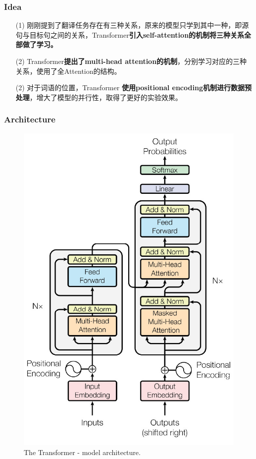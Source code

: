 \documentclass[letterpaper,10pt]{article}
\begin{document}
	\subsubsection{Idea}
	
	\begin{itemize}
	
	\item [(1)] 刚刚提到了翻译任务存在有三种关系，原来的模型只学到其中一种，即源句与目标句之间的关系，Transformer\textbf{引入self-attention的机制将三种关系全部做了学习。}
	\item [(2)]	
	Transformer\textbf{提出了multi-head attention的机制}，分别学习对应的三种关系，使用了全Attention的结构。
		
	\item[(2)] 
	对于词语的位置，Transformer \textbf{使用positional encoding机制进行数据预处理}，增大了模型的并行性，取得了更好的实验效果。
	
	\end{itemize}
	
	\subsubsection{Architecture}
	
	\begin{figure}[htbp]
		\centering 
		\includegraphics[width=0.8\columnwidth]{picture/Transfromer_architecture}
		\caption{
			\label{fig: Transformer} The Transformer - model architecture.
		}
	\end{figure}
	
\end{document}
